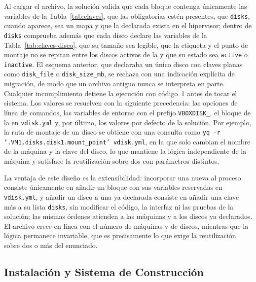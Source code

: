 Al cargar el archivo, la solución valida que cada bloque contenga únicamente las variables de la Tabla~\ref{tab:claves}, que las obligatorias estén presentes, que \texttt{disks}, cuando aparece, sea un mapa y que la \vm{} declarada exista en el hipervisor; dentro de \texttt{disks} comprueba además que cada disco declare las variables de la Tabla~\ref{tab:claves-disco}, que su tamaño sea legible, que la etiqueta y el punto de montaje no se repitan entre los discos activos de la \vm{} y que su estado sea \texttt{active} o \texttt{inactive}. El esquema anterior, que declaraba un único disco con claves planas como \texttt{disk\_file} o \texttt{disk\_size\_mb}, se rechaza con una indicación explícita de migración, de modo que un archivo antiguo nunca se interpreta en parte. Cualquier incumplimiento detiene la ejecución con código~1 antes de tocar el sistema. Los valores se resuelven con la siguiente precedencia: las opciones de línea de comandos, las variables de entorno con el prefijo \texttt{VBOXDISK\_}, el bloque de la \vm{} en \texttt{vdisk.yml} y, por último, los valores por defecto de la solución. Por ejemplo, la ruta de montaje de un disco se obtiene con una consulta como \texttt{yq -r '.VM1.disks.disk1.mount\_point' vdisk.yml}, en la que solo cambian el nombre de la máquina y la clave del disco, lo que mantiene la lógica independiente de la máquina y satisface la reutilización sobre dos \vm{} con parámetros distintos.

La ventaja de este diseño es la extensibilidad: incorporar una \vm{} nueva al proceso consiste únicamente en añadir un bloque con sus variables reservadas en \texttt{vdisk.yml}, y añadir un disco a una \vm{} ya declarada consiste en añadir una clave más a su lista \texttt{disks}, sin modificar el código, la interfaz ni las pruebas de la solución; las mismas órdenes atienden a las máquinas y a los discos ya declarados. El archivo crece en línea con el número de máquinas y de discos, mientras que la lógica permanece invariable, que es precisamente lo que exige la reutilización sobre dos o más \vm{} del enunciado.

\subsection{Instalación y Sistema de Construcción}
\label{sub:build}


